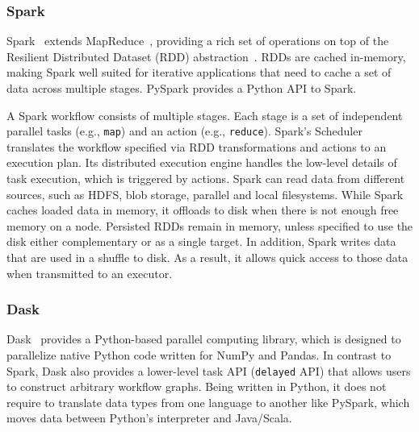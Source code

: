 
\subsubsection*{Spark}

Spark~\cite{zaharia2010spark} extends MapReduce~\cite{dean2004mapreduce},
providing a rich set of operations on top of the Resilient Distributed Dataset
(RDD) abstraction~\cite{zaharia2012resilient}. RDDs are cached in-memory, making
Spark well suited for iterative applications that need to cache a set of data
across multiple stages. PySpark provides a Python API to Spark.

A Spark workflow consists of multiple stages. Each stage is a set of independent
parallel tasks (e.g., \texttt{map}) and an action (e.g., \texttt{reduce}).
Spark's Scheduler translates the workflow specified via RDD transformations and
actions to an execution plan. Its distributed execution engine handles the
low-level details of task execution, which is triggered by actions. Spark can
read data from different sources, such as HDFS, blob storage, parallel and local
filesystems. While Spark caches loaded data in memory, it offloads to disk when
there is not enough free memory on a node. Persisted RDDs remain in memory,
unless specified to use the disk either complementary or as a single target. In
addition, Spark writes data that are used in a shuffle to disk. As a result, it
allows quick access to those data when transmitted to an executor.

\subsubsection*{Dask}

Dask~\cite{rocklin2015dask} provides a Python-based parallel computing library,
which is designed to parallelize native Python code written for NumPy and
Pandas. In contrast to Spark, Dask also provides a lower-level task API
(\texttt{delayed} API) that allows users to construct arbitrary workflow graphs.
Being written in Python, it does not require to translate data types from one
language to another like PySpark, which moves data between Python's interpreter
and Java/Scala.

